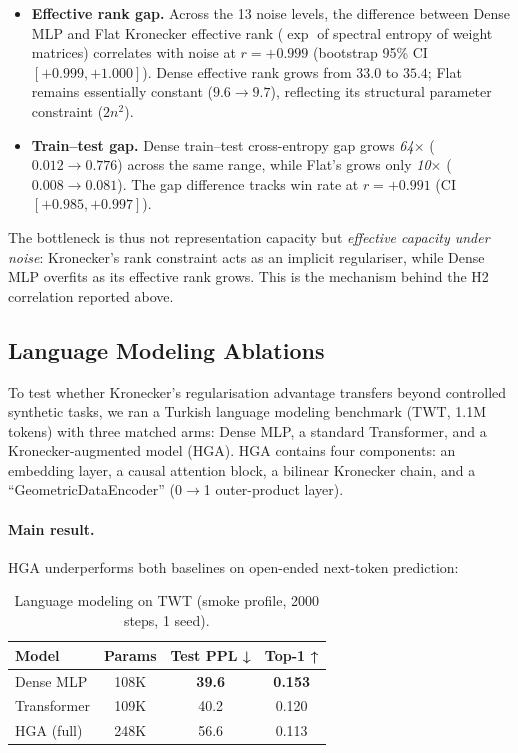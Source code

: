 \documentclass[11pt,a4paper]{article}
\begin{document}
\begin{itemize}
\item \textbf{Effective rank gap.}
      Across the 13 noise levels, the difference between
      Dense MLP and Flat Kronecker effective rank
      ($\exp$ of spectral entropy of weight matrices)
      correlates with noise at $r = +0.999$
      (bootstrap 95\% CI $[+0.999, +1.000]$).
      Dense effective rank grows from $33.0$ to $35.4$;
      Flat remains essentially constant
      ($9.6 \to 9.7$), reflecting its structural
      parameter constraint ($2n^2$).
\item \textbf{Train--test gap.}
      Dense train--test cross-entropy gap grows
      \emph{64$\times$} ($0.012 \to 0.776$) across the
      same range, while Flat's grows only
      \emph{10$\times$} ($0.008 \to 0.081$).
      The gap difference tracks win rate at
      $r = +0.991$ (CI $[+0.985, +0.997]$).
\end{itemize}

The bottleneck is thus not representation capacity but
\emph{effective capacity under noise}: Kronecker's rank
constraint acts as an implicit regulariser, while Dense
MLP overfits as its effective rank grows. This is the
mechanism behind the H2 correlation reported above.


\subsection{Language Modeling Ablations}
\label{sec:lm-ablation}

To test whether Kronecker's regularisation advantage transfers beyond
controlled synthetic tasks, we ran a Turkish language modeling benchmark
(\textsc{TWT}, 1.1M tokens) with three matched arms: Dense MLP, a
standard Transformer, and a Kronecker-augmented model (HGA). HGA
contains four components: an embedding layer, a causal attention block,
a bilinear Kronecker chain, and a ``GeometricDataEncoder'' (0$\to$1
outer-product layer).

\paragraph{Main result.} HGA underperforms both baselines on open-ended
next-token prediction:

\begin{table}[h]
\centering
\caption{Language modeling on TWT (smoke profile, 2000 steps, 1 seed).}
\label{tab:lm-main}
\small
\begin{tabular}{lccc}
\toprule
Model & Params & Test PPL ↓ & Top-1 ↑ \\
\midrule
Dense MLP & 108K & \textbf{39.6} & \textbf{0.153} \\
Transformer & 109K & 40.2 & 0.120 \\
HGA (full) & 248K & 56.6 & 0.113 \\
\bottomrule
\end{tabular}
\end{table}
\end{document}
